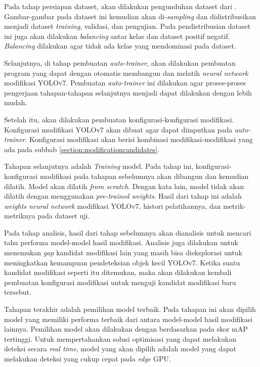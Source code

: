  Pada tahap persiapan dataset, akan dilakukan pengunduhan dataset dari \textcite{aot_dataset}.
  Gambar-gambar pada dataset ini kemudian akan di-\emph{sampling} dan didistribusikan menjadi dataset \emph{training}, validasi, dan pengujian.
  Pada pendistribusian dataset ini juga akan dilakukan \emph{balancing} antar kelas dan dataset positif negatif.
  \emph{Balancing} dilakukan agar tidak ada kelas yang mendominasi pada dataset.

  Selanjutnya, di tahap pembuatan \emph{auto-trainer}, akan dilakukan pembuatan program yang dapat dengan otomatis membangun dan melatih \emph{neural network} modifikasi YOLOv7.
  Pembuatan \emph{auto-trainer} ini dilakukan agar proses-proses pengerjaan tahapan-tahapan selanjutnya menjadi dapat dilakukan dengan lebih mudah.

  Setelah itu, akan dilakukan pembuatan konfigurasi-konfigurasi modifikasi.
  Konfigurasi modifikasi YOLOv7 akan dibuat agar dapat diinputkan pada \emph{auto-trainer}.
  Konfigurasi modifikasi akan berisi kombinasi modifikasi-modifikasi yang ada pada subbab \ref{section:modificationcandidates}.

  Tahapan selanjutnya adalah \emph{Training} model.
  Pada tahap ini, konfigurasi-konfigurasi modifikasi pada tahapan sebelumnya akan dibangun dan kemudian dilatih.
  Model akan dilatih \emph{from scratch}. Dengan kata lain, model tidak akan dilatih dengan menggunakan \emph{pre-trained weights}.
  Hasil dari tahap ini adalah \emph{weights neural network} modifikasi YOLOv7, histori pelatihannya, dan metrik-metriknya pada dataset uji.

  Pada tahap analisis, hasil dari tahap sebelumnya akan dianalisis untuk mencari tahu performa model-model hasil modifikasi.
  Analisis juga dilakukan untuk menemukan \emph{gap} kandidat modifikasi lain yang masih bisa dieksplorasi untuk meningkatkan kemampuan pendeteksian objek kecil YOLOv7.
  Ketika suatu kandidat modifikasi seperti itu ditemukan, maka akan dilakukan kembali pembuatan konfigurasi modifikasi untuk menguji kandidat modifikasi baru tersebut.

  Tahapan terakhir adalah pemilihan model terbaik.
  Pada tahapan ini akan dipilih model yang memiliki performa terbaik dari antara model-model hasil modifikasi lainnya.
  Pemilihan model akan dilakukan dengan berdasarkan pada skor mAP tertinggi.
  Untuk mempertahankan solusi optimisasi yang dapat melakukan deteksi secara \emph{real time}, model yang akan dipilih adalah model yang dapat melakukan deteksi yang cukup cepat pada \emph{edge} GPU.


